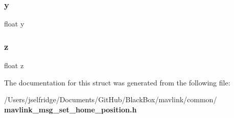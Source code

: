 \mbox{\label{struct____mavlink__set__home__position__t_aa4f0d3eebc3c443f9be81bf48561a217}} 
\subsubsection{y}
{\footnotesize\ttfamily float y}

\mbox{\label{struct____mavlink__set__home__position__t_af73583b1e980b0aa03f9884812e9fd4d}} 
\subsubsection{z}
{\footnotesize\ttfamily float z}



The documentation for this struct was generated from the following file\+:\begin{DoxyCompactItemize}
\item 
/\+Users/jselfridge/\+Documents/\+Git\+Hub/\+Black\+Box/mavlink/common/\textbf{ mavlink\+\_\+msg\+\_\+set\+\_\+home\+\_\+position.\+h}\end{DoxyCompactItemize}
